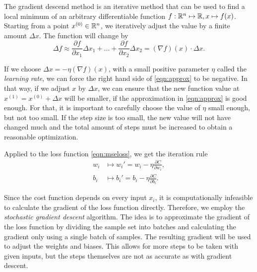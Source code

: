 The gradient descend method is an iterative method that can be used to find a local minimum of an arbitrary differentiable function $f: \mathbb{R}^n \mapsto \mathbb{R}, x \mapsto f(x)$. Starting from a point $x^{(0)} \in \mathbb{R}^n$, we iteratively adjust the value by a finite amount $\Delta x$. The function will change by
\begin{equation}
  \label{eqn:approx}
  \Delta f \approx \frac{\partial f}{\partial x_1} \Delta x_1 + \dots + \frac{\partial f}{\partial x_2} \Delta x_2 = (\nabla f)(x) \cdot \Delta x.
\end{equation}

If we choose $\Delta x = -\eta (\nabla f)(x)$, with a small positive parameter $\eta$ called the \textit{learning rate}, we can force the right hand side of \eqref{eqn:approx} to be negative. In that way, if we adjust $x$ by $\Delta x$, we can ensure that the new function value at $x^{(1)} = x^{(0)}+ \Delta x$ will be smaller, if the approximation in \eqref{eqn:approx} is good enough. For that, it is important to carefully choose the value of $\eta$ small enough, but not too small. If the step size is too small, the new value will not have changed much and the total amount of steps must be increased to obtain a reasonable optimization.

Applied to the loss function \eqref{eqn:mseloss}, we get the iteration rule
\begin{align}
  w_i & \mapsto w_i' = w_i - \eta \frac{\partial C}{\partial w_i}, \\
  b_i & \mapsto b_i' = b_i - \eta \frac{\partial C}{\partial b_i}.
\end{align}

Since the cost function depends on every input $x_i$, it is computationally infeasible to calculate the gradient of the loss function directly. Therefore, we employ the \textit{stochastic gradient descent} algorithm. The idea is to approximate the gradient of the loss function by dividing the sample set into batches and calculating the gradient only using a single batch of samples. The resulting gradient will be used to adjust the weights and biases. This allows for more steps to be taken with given inputs, but the steps themselves are not as accurate as with gradient descent.


